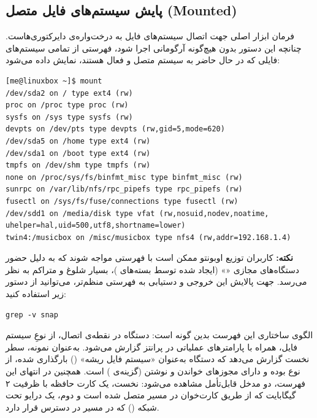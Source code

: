 \subsection{پایش سیستم‌های فایل متصل (Mounted)}

فرمان  ابزار اصلی جهت اتصال سیستم‌های فایل به درخت‌واره‌ی دایرکتوری‌هاست. چنانچه این دستور بدون هیچ‌گونه آرگومانی اجرا شود، فهرستی از تمامی سیستم‌های فایلی که در حال حاضر به سیستم متصل و فعال هستند، نمایش داده می‌شود:

\begin{latin}
\begin{lstlisting}
[me@linuxbox ~]$ mount
/dev/sda2 on / type ext4 (rw)
proc on /proc type proc (rw)
sysfs on /sys type sysfs (rw)
devpts on /dev/pts type devpts (rw,gid=5,mode=620)
/dev/sda5 on /home type ext4 (rw)
/dev/sda1 on /boot type ext4 (rw)
tmpfs on /dev/shm type tmpfs (rw)
none on /proc/sys/fs/binfmt_misc type binfmt_misc (rw)
sunrpc on /var/lib/nfs/rpc_pipefs type rpc_pipefs (rw)
fusectl on /sys/fs/fuse/connections type fusectl (rw)
/dev/sdd1 on /media/disk type vfat (rw,nosuid,nodev,noatime,
uhelper=hal,uid=500,utf8,shortname=lower)
twin4:/musicbox on /misc/musicbox type nfs4 (rw,addr=192.168.1.4)
\end{lstlisting}
\end{latin}

\begin{note}
\textbf{نکته:} کاربران توزیع اوبونتو ممکن است با فهرستی مواجه شوند که به دلیل حضور دستگاه‌های مجازی «» (ایجاد شده توسط بسته‌های )، بسیار شلوغ و متراکم به نظر می‌رسد. جهت پالایش این خروجی و دستیابی به فهرستی منظم‌تر، می‌توانید از دستور زیر استفاده کنید:
\begin{latin}
\begin{lstlisting}
grep -v snap
\end{lstlisting}
\end{latin}
\end{note}

الگوی ساختاری این فهرست بدین گونه است: دستگاه در نقطه‌ی اتصال، از نوعِ سیستم فایل، همراه با پارامترهای عملیاتی در پرانتز گزارش می‌شود. به‌عنوان نمونه، سطر نخست گزارش می‌دهد که دستگاه  به‌عنوان «سیستم فایل ریشه» () بارگذاری شده، از نوع  بوده و دارای مجوزهای خواندن و نوشتن (گزینه‌ی ) است. همچنین در انتهای این فهرست، دو مدخل قابل‌تأمل مشاهده می‌شود: نخست، یک کارت حافظه با ظرفیت ۲ گیگابایت که از طریق کارت‌خوان در مسیر  متصل شده است و دوم، یک درایو تحت شبکه () که در مسیر  در دسترس قرار دارد.

